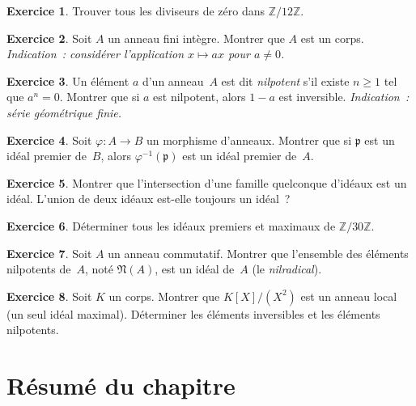\documentclass[12pt,a4paper,openany]{book}
\theoremstyle{definition}
\newtheorem{exercice}{Exercice}[chapter]
\newcommand{\Z}{\mathbb{Z}}
\begin{document}
\begin{exercice}\label{exo:ann-4}
Trouver tous les diviseurs de zéro dans $\Z/12\Z$.
\end{exercice}

\begin{exercice}\label{exo:ann-5}
Soit $A$ un anneau fini intègre. Montrer que $A$ est un corps.
\emph{Indication~: considérer l'application $x \mapsto ax$ pour
$a \neq 0$.}
\end{exercice}

\begin{exercice}\label{exo:ann-6}
Un élément $a$ d'un anneau~$A$ est dit \emph{nilpotent} s'il existe
$n \geqslant 1$ tel que $a^n = 0$. Montrer que si $a$ est nilpotent,
alors $1 - a$ est inversible. \emph{Indication~: série géométrique finie.}
\end{exercice}

\begin{exercice}\label{exo:ann-7}
Soit $\varphi \colon A \to B$ un morphisme d'anneaux. Montrer que si
$\mathfrak{p}$ est un idéal premier de~$B$, alors
$\varphi^{-1}(\mathfrak{p})$ est un idéal premier de~$A$.
\end{exercice}

\begin{exercice}\label{exo:ann-8}
Montrer que l'intersection d'une famille quelconque d'idéaux est un idéal.
L'union de deux idéaux est-elle toujours un idéal~?
\end{exercice}

\begin{exercice}\label{exo:ann-9}
Déterminer tous les idéaux premiers et maximaux de $\Z/30\Z$.
\end{exercice}

\begin{exercice}\label{exo:ann-10}
Soit $A$ un anneau commutatif. Montrer que l'ensemble des éléments
nilpotents de~$A$, noté $\mathfrak{N}(A)$, est un
idéal de~$A$ (le \emph{nilradical}).
\end{exercice}

\begin{exercice}\label{exo:ann-11}
Soit $K$ un corps. Montrer que $K[X]/(X^2)$ est un anneau local (un seul
idéal maximal). Déterminer les éléments inversibles et les éléments
nilpotents.
\end{exercice}

\section*{Résumé du chapitre~\thechapter}
\end{document}
